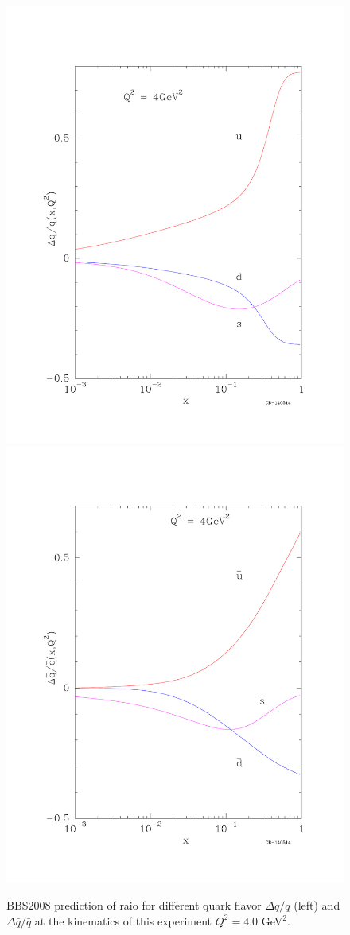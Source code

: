 \begin{figure} [htbp]
  \centering
    \includegraphics[width=0.49\linewidth]{figs_xj/BBS_deltaqoq.pdf}
    \includegraphics[width=0.49\linewidth]{figs_xj/BBS_deltaqbaroqbar.pdf} \\
  \caption{\label{fig:BBS_deltaqoq} BBS2008 prediction of raio for different quark flavor $\Delta q/q$  (left) and $\Delta \bar{q}/\bar{q}$ at the kinematics of this experiment $Q^2=4.0$ GeV$^2$.  }
\end{figure}

